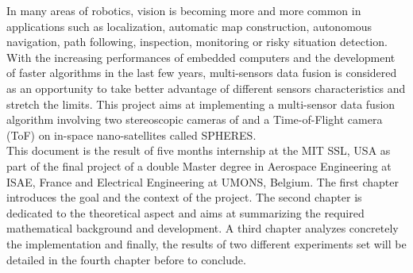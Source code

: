 \cleardoublepage
\setcounter{savepage}{\thepage}
\begin{abstractpage}
In many areas of robotics, vision is becoming more and more common in applications such as localization, automatic map construction, autonomous navigation, path following, inspection, monitoring or risky situation detection. With the increasing performances of embedded computers and the development of faster algorithms in the last few years, multi-sensors data fusion is considered as an opportunity to take better advantage of different sensors characteristics and stretch the limits. This project aims at implementing a multi-sensor data fusion algorithm involving two stereoscopic cameras of and a Time-of-Flight camera (\gls{ToF}) on in-space nano-satellites called SPHERES.\\
This document is the result of five months internship at the MIT SSL, USA as part of the final project of a double Master degree in Aerospace Engineering at ISAE, France and Electrical Engineering at UMONS, Belgium. The first chapter introduces the goal and the context of the project. The second chapter is dedicated to the theoretical aspect and aims at summarizing the required mathematical background and development. A third chapter analyzes concretely the implementation and finally, the results of two different experiments set will be detailed in the fourth chapter before to conclude.
\end{abstractpage}

% 

\cleardoublepage

